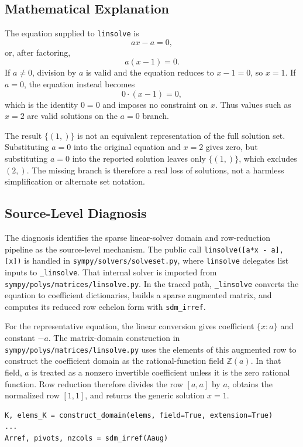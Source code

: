 \documentclass[11pt]{article}
\begin{document}
\subsection{Mathematical Explanation}

The equation supplied to \texttt{linsolve} is
\[
  a x - a = 0,
\]
or, after factoring,
\[
  a(x-1)=0.
\]
If \(a\ne 0\), division by \(a\) is valid and the equation reduces to
\(x-1=0\), so \(x=1\).  If \(a=0\), the equation instead becomes
\[
  0\cdot (x-1)=0,
\]
which is the identity \(0=0\) and imposes no constraint on \(x\).  Thus values
such as \(x=2\) are valid solutions on the \(a=0\) branch.

The result \(\{(1,)\}\) is not an equivalent representation of the full
solution set.  Substituting \(a=0\) into the original equation and \(x=2\) gives
zero, but substituting \(a=0\) into the reported solution leaves only
\(\{(1,)\}\), which excludes \((2,)\).  The missing branch is therefore a real
loss of solutions, not a harmless simplification or alternate set notation.

\subsection{Source-Level Diagnosis}

The diagnosis identifies the sparse linear-solver domain and row-reduction
pipeline as the source-level mechanism.  The public call
\texttt{linsolve([a*x - a], [x])} is handled in
\nolinkurl{sympy/solvers/solveset.py}, where \texttt{linsolve} delegates list
inputs to \texttt{\_linsolve}.  That internal solver is imported from
\nolinkurl{sympy/polys/matrices/linsolve.py}.  In the traced path,
\texttt{\_linsolve} converts the equation to coefficient dictionaries, builds a
sparse augmented matrix, and computes its reduced row echelon form with
\texttt{sdm\_irref}.

For the representative equation, the linear conversion gives coefficient
\(\{x: a\}\) and constant \(-a\).  The matrix-domain construction in
\nolinkurl{sympy/polys/matrices/linsolve.py} uses the elements of this
augmented row to construct the coefficient domain as the rational-function
field \(\mathbb{Z}(a)\).  In that field, \(a\) is treated as a nonzero
invertible coefficient unless it is the zero rational function.  Row reduction
therefore divides the row \([a,a]\) by \(a\), obtains the normalized row
\([1,1]\), and returns the generic solution \(x=1\).

\begin{lstlisting}[style=bugpython]
K, elems_K = construct_domain(elems, field=True, extension=True)
...
Arref, pivots, nzcols = sdm_irref(Aaug)
\end{lstlisting}
\end{document}
